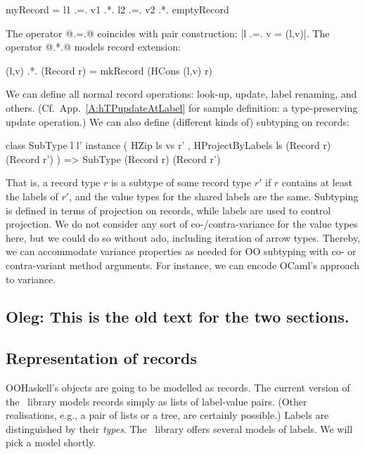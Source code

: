 \begin{code}
 myRecord =  l1 .=. v1
         .*. l2 .=. v2
         .*. emptyRecord
\end{code}

\noindent
The operator @.=.@ coincides with pair construction: |l .=. v = (l,v)|.
The operator @.*.@ models record extension:

\begin{code}
 (l,v) .*. (Record r) = mkRecord (HCons (l,v) r)
\end{code}

\noindent
We can define all normal record operations: look-up, update, label
renaming, and others. (Cf.\ App.~\ref{A:hTPupdateAtLabel} for sample
definition: a type-preserving update operation.) We can also define
(different kinds of) subtyping on records:

\begin{code}
 class SubType l l'
 instance ( HZip ls vs r'
      , HProjectByLabels ls (Record r) (Record r') )
  =>    SubType (Record r) (Record r')
\end{code}

\noindent
That is, a record type $r$ is a subtype of some record type $r'$ if
$r$ contains at least the labels of $r'$, and the value types for the
shared labels are the same. Subtyping is defined in terms of
projection on records, while labels are used to control projection.
We do not consider any sort of co-/contra-variance for the value types
here, but we could do so without ado, including iteration of arrow
types. Thereby, we can accommodate variance properties as needed for
OO subtyping with co- or contra-variant method arguments. For
instance, we can encode OCaml's approach to variance.


\subsection{Oleg: This is the old text for the two sections.}

\subsection{Representation of records}

OOHaskell's objects are going to be modelled as records. The current
version of the \HList\ library models records simply as lists of
label-value pairs. (Other realisations, e.g., a pair of lists or a
tree, are certainly possible.) Labels are distinguished by their
\emph{types}. The \HList\ library offers several models of labels. We
will pick a model shortly.

